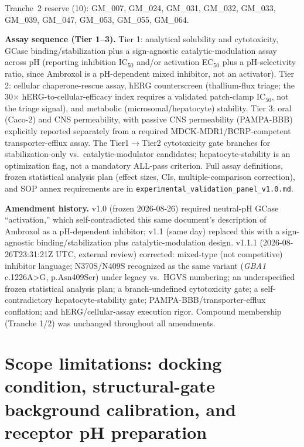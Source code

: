 \documentclass{article}
\begin{document}
Tranche~2 reserve (10): GM\_007, GM\_024, GM\_031, GM\_032, GM\_033, GM\_039, GM\_047, GM\_053, GM\_055, GM\_064.

\textbf{Assay sequence (Tier 1--3).} Tier 1: analytical solubility and cytotoxicity, GCase binding/stabilization plus a sign-agnostic catalytic-modulation assay across pH (reporting inhibition IC$_{50}$ and/or activation EC$_{50}$ plus a pH-selectivity ratio, since Ambroxol is a pH-dependent mixed inhibitor, not an activator). Tier 2: cellular chaperone-rescue assay, hERG counterscreen (thallium-flux triage; the 30$\times$ hERG-to-cellular-efficacy index requires a validated patch-clamp IC$_{50}$, not the triage signal), and metabolic (microsomal/hepatocyte) stability. Tier 3: oral (Caco-2) and CNS permeability, with passive CNS permeability (PAMPA-BBB) explicitly reported separately from a required MDCK-MDR1/BCRP-competent transporter-efflux assay. The Tier1$\to$Tier2 cytotoxicity gate branches for stabilization-only vs.\ catalytic-modulator candidates; hepatocyte-stability is an optimization flag, not a mandatory ALL-pass criterion. Full assay definitions, frozen statistical analysis plan (effect sizes, CIs, multiple-comparison correction), and SOP annex requirements are in \texttt{experimental\_validation\_panel\_v1.0.md}.

\textbf{Amendment history.} v1.0 (frozen 2026-08-26) required neutral-pH GCase ``activation,'' which self-contradicted this same document's description of Ambroxol as a pH-dependent inhibitor; v1.1 (same day) replaced this with a sign-agnostic binding/stabilization plus catalytic-modulation design. v1.1.1 (2026-08-26T23:31:21Z UTC, external review) corrected: mixed-type (not competitive) inhibitor language; N370S/N409S recognized as the same variant (\textit{GBA1} c.1226A\textgreater{}G, p.Asn409Ser) under legacy vs.\ HGVS numbering; an underspecified frozen statistical analysis plan; a branch-undefined cytotoxicity gate; a self-contradictory hepatocyte-stability gate; PAMPA-BBB/transporter-efflux conflation; and hERG/cellular-assay execution rigor. Compound membership (Tranche 1/2) was unchanged throughout all amendments.

\FloatBarrier

\section{Scope limitations: docking condition, structural-gate background calibration, and receptor pH preparation}
\label{app:h}
\end{document}
